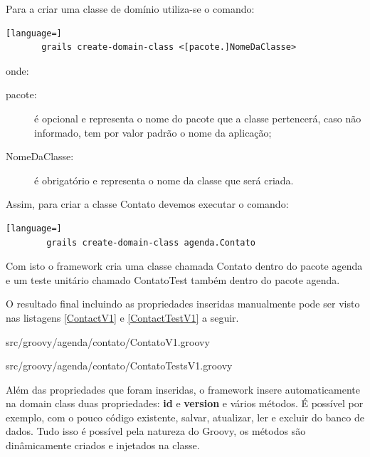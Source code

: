 \documentclass[12pt]{article}
\begin{document}
    Para a criar uma classe de domínio utiliza-se o comando: 

    \begin{lstlisting}[language=]
       grails create-domain-class <[pacote.]NomeDaClasse>
    \end{lstlisting}
    
    onde:
    
    \begin{description}
        \item[pacote:] é opcional e representa o nome do pacote que a classe 
                      pertencerá, caso não informado, tem por valor padrão o nome
                      da aplicação;
        \item[NomeDaClasse:] é obrigatório e representa o nome da classe que será
                             criada.
    \end{description}
    
    Assim, para criar a classe Contato devemos executar o comando:
    
    \begin{lstlisting}[language=]
        grails create-domain-class agenda.Contato
    \end{lstlisting}
    
    Com isto o framework cria uma classe chamada Contato dentro do pacote agenda 
    e um teste unitário chamado ContatoTest também dentro do pacote agenda.
    
    O resultado final incluindo as propriedades inseridas manualmente pode ser visto
    nas listagens \ref{ContactV1} e \ref{ContactTestV1} a seguir.
    
    
                    {src/groovy/agenda/contato/ContatoV1.groovy}

   
                    {src/groovy/agenda/contato/ContatoTestsV1.groovy}

    Além das propriedades que foram inseridas, o framework insere automaticamente
    na domain class duas propriedades: \textbf{id} e \textbf{version} e vários métodos.
    É possível por exemplo, com o pouco código existente, salvar, atualizar, ler
    e excluir do banco de dados. Tudo isso é possível pela natureza do Groovy, 
    os métodos são dinâmicamente criados e injetados na classe.
\end{document}
